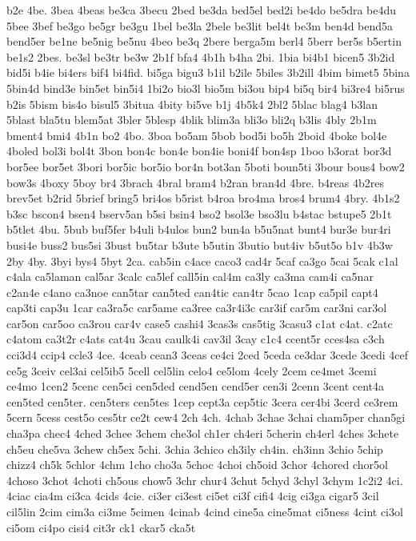 {b2e
4be.
3bea
4beas
be3ca
3becu
2bed
be3da
bed5el
bed2i
be4do
be5dra
be4du
5bee
3bef
be3go
be5gr
be3gu
1bel
be3la
2bele
be3lit
bel4t
be3m
ben4d
bend5a
bend5er
be1ne
be5nig
be5nu
4beo
be3q
2bere
berga5m
berl4
5berr
ber5s
b5ertin
be1s2
2bes.
be3sl
be3tr
be3w
2b1f
bfa4
4b1h
b4ha
2bi.
1bia
bi4b1
bicen5
3b2id
bid5i
b4ie
bi4ers
bif4
bi4fid.
bi5ga
bigu3
b1il
b2ile
5biles
3b2ill
4bim
bimet5
5bina
5bin4d
bind3e
bin5et
bin5i4
1bi2o
bio3l
bio5m
bi3ou
bip4
bi5q
bir4
bi3re4
bi5rus
b2is
5bism
bis4o
bisul5
3bitua
4bity
bi5ve
b1j
4b5k4
2bl2
5blac
blag4
b3lan
5blast
bla5tu
blem5at
3bler
5blesp
4blik
blim3a
bli3o
bli2q
b3lis
4bly
2b1m
bment4
bmi4
4b1n
bo2
4bo.
3boa
bo5am
5bob
bod5i
bo5h
2boid
4boke
bol4e
4boled
bol3i
bol4t
3bon
bon4c
bon4e
bon4ie
boni4f
bon4sp
1boo
b3orat
bor3d
bor5ee
bor5et
3bori
bor5ic
bor5io
bor4n
bot3an
5boti
boun5ti
3bour
bous4
bow2
bow3s
4boxy
5boy
br4
3brach
4bral
bram4
b2ran
bran4d
4bre.
b4reas
4b2res
brev5et
b2rid
5brief
bring5
bri4os
b5rist
b4roa
bro4ma
bros4
brum4
4bry.
4b1s2
b3sc
bscon4
bsen4
bserv5an
b5si
bsin4
bso2
bsol3e
bso3lu
b4stac
bstupe5
2b1t
b5tlet
4bu.
5bub
buf5fer
b4uli
b4ulos
bun2
bun4a
b5u5nat
bunt4
bur3e
bur4ri
busi4e
buss2
bus5si
3bust
bu5tar
b3ute
b5utin
3butio
but4iv
b5ut5o
b1v
4b3w
2by
4by.
3byi
bys4
5byt
2ca.
cab5in
c4ace
caco3
cad4r
5caf
ca3go
5cai
5cak
c1al
c4ala
ca5laman
cal5ar
3calc
ca5lef
call5in
cal4m
ca3ly
ca3ma
cam4i
ca5nar
c2an4e
c4ano
ca3noe
can5tar
can5ted
can4tic
can4tr
5cao
1cap
ca5pil
capt4
cap3ti
cap3u
1car
ca3ra5c
car5ame
ca3ree
ca3r4i3c
car3if
car5m
car3ni
car3ol
car5on
car5oo
ca3rou
car4v
case5
cashi4
3cas3s
cas5tig
3casu3
c1at
c4at.
c2atc
c4atom
ca3t2r
c4ats
cat4u
3cau
caulk4i
cav3il
3cay
c1c4
ccent5r
cces4sa
c3ch
cci3d4
ccip4
ccle3
4ce.
4ceab
cean3
3ceas
ce4ci
2ced
5ceda
ce3dar
3cede
3cedi
4cef
ce5g
3ceiv
cel3ai
cel5ib5
5cell
cel5lin
celo4
ce5lom
4cely
2cem
ce4met
3cemi
ce4mo
1cen2
5cenc
cen5ci
cen5ded
cend5en
cend5er
cen3i
2cenn
3cent
cent4a
cen5ted
cen5ter.
cen5ters
cen5tes
1cep
cept3a
cep5tic
3cera
cer4bi
3cerd
ce3rem
5cern
5cess
cest5o
ces5tr
ce2t
cew4
2ch
4ch.
4chab
3chae
3chai
cham5per
chan5gi
cha3pa
chec4
4ched
3chee
3chem
che3ol
ch1er
ch4eri
5cherin
ch4erl
4ches
3chete
ch5eu
che5va
3chew
ch5ex
5chi.
3chia
3chico
ch3ily
ch4in.
ch3inn
3chio
5chip
chizz4
ch5k
5chlor
4chm
1cho
cho3a
5choc
4choi
ch5oid
3chor
4chored
chor5ol
4choso
3chot
4choti
ch5ous
chow5
3chr
chur4
3chut
5chyd
3chyl
3chym
1c2i2
4ci.
4ciac
cia4m
ci3ca
4cids
4cie.
ci3er
ci3est
ci5et
ci3f
cifi4
4cig
ci3ga
cigar5
3cil
cil5lin
2cim
cim3a
ci3me
5cimen
4cinab
4cind
cine5a
cine5mat
ci5ness
4cint
ci3ol
ci5om
ci4po
cisi4
cit3r
ck1
ckar5
cka5t
}
